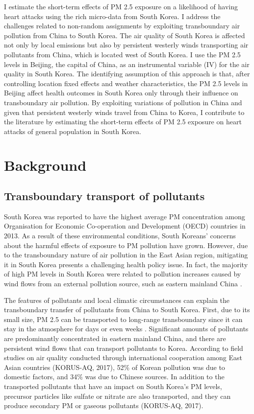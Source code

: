 \documentclass{article}
\begin{document}
I estimate the short-term effects of PM 2.5 exposure on a likelihood of having heart attacks using the rich micro-data from South Korea. I address the challenges related to non-random assignments by exploiting transboundary air pollution from China to South Korea. The air quality of South Korea is affected not only by local emissions but also by  persistent westerly winds transporting air pollutants from China, which is located west of South Korea. I use the PM 2.5 levels in Beijing, the capital of China, as an instrumental variable (IV) for the air quality in South Korea. The identifying assumption of this approach is that, after controlling location fixed effects and weather characteristics, the PM 2.5 levels in Beijing affect health outcomes in South Korea only through their influence on transboundary air pollution. By exploiting variations of pollution in China and given that persistent westerly winds travel from China to Korea, I contribute to the literature by estimating the short-term effects of PM 2.5 exposure on heart attacks of general population in South Korea.


\section{Background}
\subsection{Transboundary transport of pollutants}
South Korea was reported to have the highest average PM concentration among Organisation for Economic Co-operation and Development (OECD) countries in 2013. As a result of these environmental conditions, South Koreans' concerns about the harmful effects of exposure to PM pollution have grown. However, due to the transboundary nature of air pollution in the East Asian region, mitigating it in South Korea presents a challenging health policy issue. In fact, the majority of high PM levels in South Korea were related to pollution increases caused by wind flows from an external pollution source, such as eastern mainland China \parencite{lee2011high,lee2017estimating}.

The features of pollutants and local climatic circumstances can explain the transboundary transfer of pollutants from China to South Korea. First, due to its small size, PM 2.5 can be transported to long-range transboundary since it can stay in the atmosphere for days or even weeks \parencite{national2010global}. Significant amounts of pollutants are predominantly concentrated in eastern mainland China, and there are persistent wind flows that can transport pollutants to Korea.
According to field studies on air quality conducted through international cooperation among East Asian countries (KORUS-AQ, 2017), 52\% of Korean pollution was due to domestic factors, and 34\% was due to Chinese sources. In addition to the transported pollutants that have an impact on South Korea's PM levels, precursor particles like sulfate or nitrate are also transported, and they can produce secondary PM or gaseous pollutants (KORUS-AQ, 2017).
\end{document}
